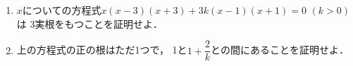 \documentclass[../../main.tex]{subfiles}
\begin{document}
\begin{enumerate}
  \item $x$についての方程式$x(x-3)(x+3)+3k(x-1)(x+1)=0$ $(k>0)$は
    3実根をもつことを証明せよ．
  \item 上の方程式の正の根はただ1つで，
    1と$\displaystyle 1+\dfrac{2}{k}$との間にあることを証明せよ．
\end{enumerate}
\end{document}
